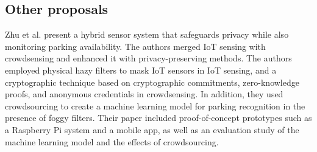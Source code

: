 \subsection{Other proposals}


Zhu et al. \cite{ZhuIntegrating} present a hybrid sensor system that safeguards
privacy while also monitoring parking availability. The authors merged IoT
sensing with crowdsensing and enhanced it with privacy-preserving methods.
The authors employed physical hazy filters to mask IoT sensors in IoT sensing,
and a cryptographic technique based on cryptographic commitments, zero-knowledge
proofs, and anonymous credentials in crowdsensing. In addition, they used
crowdsourcing to create a machine learning model for parking recognition
in the presence of foggy filters. Their paper included proof-of-concept
prototypes such as a Raspberry Pi system and a mobile app, as well as an
evaluation study of the machine learning model and the effects of crowdsourcing.



